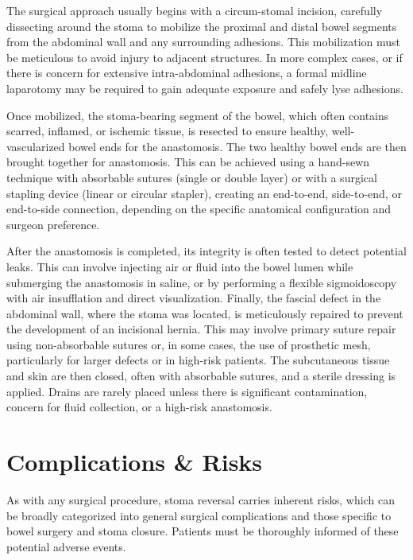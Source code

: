 The surgical approach usually begins with a circum-stomal incision, carefully dissecting around the stoma to mobilize the proximal and distal bowel segments from the abdominal wall and any surrounding adhesions. This mobilization must be meticulous to avoid injury to adjacent structures. In more complex cases, or if there is concern for extensive intra-abdominal adhesions, a formal midline laparotomy may be required to gain adequate exposure and safely lyse adhesions. 

Once mobilized, the stoma-bearing segment of the bowel, which often contains scarred, inflamed, or ischemic tissue, is resected to ensure healthy, well-vascularized bowel ends for the anastomosis. The two healthy bowel ends are then brought together for anastomosis. This can be achieved using a hand-sewn technique with absorbable sutures (single or double layer) or with a surgical stapling device (linear or circular stapler), creating an end-to-end, side-to-end, or end-to-side connection, depending on the specific anatomical configuration and surgeon preference.

After the anastomosis is completed, its integrity is often tested to detect potential leaks. This can involve injecting air or fluid into the bowel lumen while submerging the anastomosis in saline, or by performing a flexible sigmoidoscopy with air insufflation and direct visualization. Finally, the fascial defect in the abdominal wall, where the stoma was located, is meticulously repaired to prevent the development of an incisional hernia. This may involve primary suture repair using non-absorbable sutures or, in some cases, the use of prosthetic mesh, particularly for larger defects or in high-risk patients. The subcutaneous tissue and skin are then closed, often with absorbable sutures, and a sterile dressing is applied. Drains are rarely placed unless there is significant contamination, concern for fluid collection, or a high-risk anastomosis.

\section*{Complications \& Risks}
As with any surgical procedure, stoma reversal carries inherent risks, which can be broadly categorized into general surgical complications and those specific to bowel surgery and stoma closure. Patients must be thoroughly informed of these potential adverse events.

